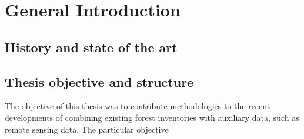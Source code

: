 	
			
	

	
\chapter{General Introduction}
\label{chap:intro}
\newpage

\section{History and state of the art}
\label{sec:intro:hist_soa}
\newpage



\section{Thesis objective and structure}
\label{sec:intro:obj_and_struct}

The objective of this thesis was to contribute methodologies to the recent developments of combining existing forest inventories with auxiliary data, such as remote sensing data. The particular objective






%
%

